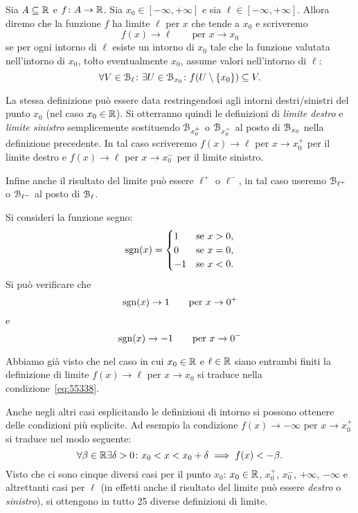 \begin{definition}
\mymark{***}
Sia $A\subseteq {\mathbb R}$ e $f\colon A \to {\mathbb R}$. 
Sia $x_0\in [-\infty,+\infty]$
e sia $\ell \in [-\infty,+\infty]$.
Allora diremo che la funzione $f$ ha limite $\ell$ per $x$ che tende a $x_0$ 
e scriveremo%
\[
  f(x) \to \ell \qquad \text{per $x\to x_0$}
\]
se per ogni intorno di $\ell$ esiste un intorno di $x_0$ tale che
la funzione valutata nell'intorno di $x_0$, tolto eventualmente $x_0$,
assume valori
nell'intorno di $\ell$:
\begin{equation}\label{eq:def_limite}
  \forall V \in \mathcal B_\ell \colon \exists U \in \mathcal B_{x_0} \colon f(U\setminus{\left\{ x_0 \right\}}) \subseteq V.
\end{equation}

La stessa definizione può essere data restringendosi agli intorni destri/sinistri del punto $x_0$ (nel caso $x_0 \in {\mathbb R}$). Si otterranno quindi le definizioni
di \emph{limite destro} e \emph{limite sinistro}
%
semplicemente sostituendo $\mathcal B_{x_0^+}$ o $\mathcal B_{x_0^-}$ al posto di 
$\mathcal B_{x_0}$ nella definizione
precedente. 
In tal caso scriveremo $f(x)\to \ell$ per $x\to x_0^+$ per il limite 
destro e $f(x)\to \ell$ per $x\to x_0^-$ per il limite sinistro.

Infine anche il risultato del limite può essere $\ell^+$ o $\ell^-$, 
in tal caso useremo $\mathcal B_{\ell^+}$ o $\mathcal B_{\ell^-}$ 
al posto di $\mathcal B_{\ell}$.
\end{definition}
  
\begin{example}
Si consideri la funzione segno:
\[
\operatorname{sgn}(x) =
\begin{cases}
  1 & \text{se $x>0$},\\
  0 & \text{se $x=0$},\\
  -1 & \text{se $x<0$}.
\end{cases}
\]
Si può verificare che
\[
\operatorname{sgn}(x) \to 1 \qquad \text{per $x\to 0^+$}
\]
e
\[
\operatorname{sgn}(x) \to -1 \qquad \text{per $x\to 0^-$}
\]
\end{example}

Abbiamo già visto che nel caso in cui $x_0\in {\mathbb R}$ e $\ell\in {\mathbb R}$ 
siano entrambi finiti 
la definizione di limite $f(x)\to \ell$ per $x\to x_0$
si traduce nella condizione~\eqref{eq:55338}.

Anche negli altri casi esplicitando le definizioni di intorno
si possono ottenere delle condizioni più esplicite.
Ad esempio la condizione $f(x)\to -\infty$ per $x\to x_0^+$
si traduce nel modo seguente:
\[
\forall \beta\in {\mathbb R}\exists \delta>0 \colon x_0 < x < x_0+\delta 
\implies f(x) < -\beta.  
\]
Visto che ci sono cinque diversi casi per il punto $x_0$:
$x_0\in {\mathbb R}$, $x_0^+$, $x_0^-$, $+\infty$, $-\infty$ e altrettanti 
casi per $\ell$ (in effetti anche il risultato del limite 
può essere \emph{destro} o \emph{sinistro}), si ottengono 
in tutto 25 diverse definizioni di limite.

